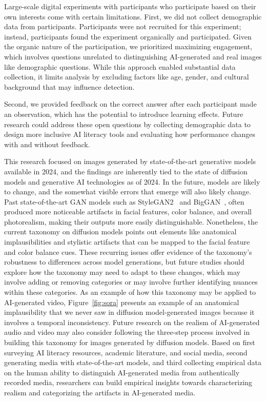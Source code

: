 Large-scale digital experiments with participants who participate based on their own interests come with certain limitations. First, we did not collect demographic data from participants. Participants were not recruited for this experiment; instead, participants found the experiment organically and participated. Given the organic nature of the participation, we prioritized maximizing engagement, which involves questions unrelated to distinguishing AI-generated and real images like demographic questions. While this approach enabled substantial data collection, it limits analysis by excluding factors like age, gender, and cultural background that may influence detection. 

Second, we provided feedback on the correct answer after each participant made an observation, which has the potential to introduce learning effects. Future research could address these open questions by collecting demographic data to design more inclusive AI literacy tools and evaluating how performance changes with and without feedback. 

This research focused on images generated by state-of-the-art generative models available in 2024, and the findings are inherently tied to the state of diffusion models and generative AI technologies as of 2024. In the future, models are likely to change, and the somewhat visible errors that emerge will also likely change. Past state-of-the-art GAN models such as StyleGAN2~\cite{karras2020analyzingimprovingimagequality} and BigGAN~\cite{brock2018biggan}, often produced more noticeable artifacts in facial features, color balance, and overall photorealism, making their outputs more easily distinguishable. Nonetheless, the current taxonomy on diffusion models points out elements like anatomical implausibilities and stylistic artifacts that can be mapped to the facial feature and color balance cues. These recurring issues offer evidence of the taxonomy’s robustness to differences across model generations, but future studies should explore how the taxonomy may need to adapt to these changes, which may involve adding or removing categories or may involve further identifying nuances within these categories. As an example of how this taxonomy may be applied to AI-generated video, Figure~\ref{fig:sora} presents an example of an anatomical implausibility that we never saw in diffusion model-generated images because it involves a temporal inconsistency. Future research on the realism of AI-generated audio and video may also consider following the three-step process involved in building this taxonomy for images generated by diffusion models. Based on first surveying AI literacy resources, academic literature, and social media, second generating media with state-of-the-art models, and third collecting empirical data on the human ability to distinguish AI-generated media from authentically recorded media, researchers can build empirical insights towards characterizing realism and categorizing the artifacts in AI-generated media.  
 
